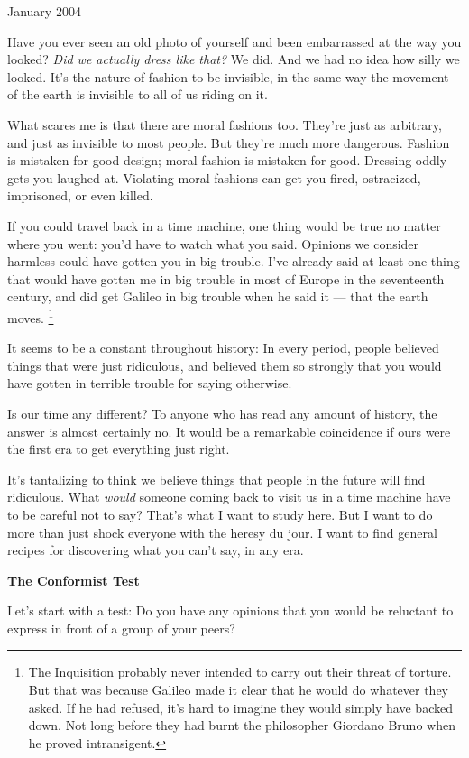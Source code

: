 \documentclass[12pt]{book}
\begin{document}
January 2004

Have you ever seen an old photo of yourself and been embarrassed at the
way you looked? \emph{Did we actually dress like that?} We did. And we
had no idea how silly we looked. It's the nature of fashion to be
invisible, in the same way the movement of the earth is invisible to all
of us riding on it.

What scares me is that there are moral fashions too. They're just as
arbitrary, and just as invisible to most people. But they're much more
dangerous. Fashion is mistaken for good design; moral fashion is
mistaken for good. Dressing oddly gets you laughed at. Violating moral
fashions can get you fired, ostracized, imprisoned, or even killed.

If you could travel back in a time machine, one thing would be true no
matter where you went: you'd have to watch what you said. Opinions we
consider harmless could have gotten you in big trouble. I've already
said at least one thing that would have gotten me in big trouble in most
of Europe in the seventeenth century, and did get Galileo in big trouble
when he said it --- that the earth moves. \footnote{The Inquisition probably never intended to carry out their
threat of torture. But that was because Galileo made it clear that he
would do whatever they asked. If he had refused, it's hard to imagine
they would simply have backed down. Not long before they had burnt the
philosopher Giordano Bruno when he proved intransigent.}

It seems to be a constant throughout history: In every period, people
believed things that were just ridiculous, and believed them so strongly
that you would have gotten in terrible trouble for saying otherwise.

Is our time any different? To anyone who has read any amount of history,
the answer is almost certainly no. It would be a remarkable coincidence
if ours were the first era to get everything just right.

It's tantalizing to think we believe things that people in the future
will find ridiculous. What \emph{would} someone coming back to visit us
in a time machine have to be careful not to say? That's what I want to
study here. But I want to do more than just shock everyone with the
heresy du jour. I want to find general recipes for discovering what you
can't say, in any era.

\textbf{The Conformist Test}

Let's start with a test: Do you have any opinions that you would be
reluctant to express in front of a group of your peers?
\end{document}

